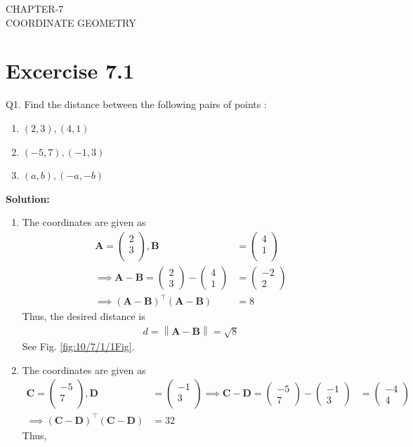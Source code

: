 \documentclass[12pt]{article}
\providecommand{\brak}[1]{\ensuremath{\left(#1\right)}}
\providecommand{\norm}[1]{\left\lVert#1\right\rVert}
\newcommand{\solution}{\noindent \textbf{Solution: }}
\newcommand{\myvec}[1]{\ensuremath{\begin{pmatrix}#1\end{pmatrix}}}
\let\vec\mathbf
\begin{document}
\begin{center}
\textbf\large{CHAPTER-7 \\ COORDINATE GEOMETRY}
\end{center}
\section*{Excercise 7.1}

Q1. Find the distance between the following pairs of points :
\begin{enumerate}
	\item $\brak{2,3}, \brak{4,1}$ 
	\item $\brak{-5,7}, \brak{-1,3}$
	\item $\brak{a,b}, \brak{-a,-b}$
\end{enumerate}
\fi
\solution
\begin{enumerate}
\item The coordinates are given as
	\begin{align}
	\vec{A} = \myvec{
		2\\
		3\\
		},
		\vec{B} &= \myvec{
		4\\
		1\\
		}
		\\
\implies		\vec{A} - \vec{B} = \myvec{2\\3} - \myvec{4\\1} &= \myvec{-2\\2}		
\\
		\implies		(\vec{A}-\vec{B})^\top (\vec{A}-\vec{B}) &= 8
	\end{align}
	Thus, the desired distance is 
	\begin{align}
		d=\norm{\vec{A}-\vec{B}} =\sqrt{8}
	\end{align}
	See Fig. \ref{fig:10/7/1/1Fig}.
\item The coordinates are given as
	\begin{align}
	\vec{C} = \myvec{
		-5\\
		7\\
		},
		\vec{D} &= \myvec{
		-1\\
		3\\
		}
\implies		\vec{C} - \vec{D} = \myvec{-5\\7} - \myvec{-1\\3} &= \myvec{-4\\4}		
		\\
		\implies		(\vec{C}-\vec{D})^\top (\vec{C}-\vec{D}) &= 32
	\end{align}
Thus,	
	\begin{align}

\end{align}
\end{enumerate}
\end{document}
